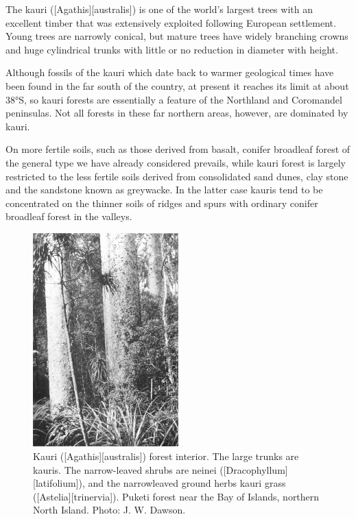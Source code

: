 The kauri ([Agathis][australis]) is one of the world's largest trees with an excellent timber that was extensively exploited following European settlement.
Young trees are narrowly conical, but mature trees have widely branching crowns and huge cylindrical trunks with little or no reduction in diameter with height.

Although fossils of the kauri which date back to warmer geological times have been found in the far south of the country, at present it reaches its limit at about \ang{38}S, so kauri forests are essentially a feature of the Northland and Coromandel peninsulas.
Not all forests in these far northern areas, however, are dominated by kauri.

On more fertile soils, such as those derived from basalt, conifer broadleaf forest of the general type we have already considered prevails, while kauri forest is largely restricted to the less fertile soils derived from consolidated sand dunes, clay stone and the sandstone known as greywacke.
In the latter case kauris tend to be concentrated on the thinner soils of ridges and spurs with ordinary conifer broadleaf forest in the valleys.

\begin{figure}
	\includegraphics[width=0.5\textwidth]{graphics/figure65kauri.jpg}
	\centering
	\caption[Kauri forest interior]{Kauri ([Agathis][australis]) forest interior.
	The large trunks are kauris.
	The narrow-leaved shrubs are neinei ([Dracophyllum][latifolium]), and the narrowleaved ground herbs kauri grass ([Astelia][trinervia]).
	Puketi forest near the Bay of Islands, northern North Island.
	Photo:  J. W. Dawson.}%
	\label{fig:65kauri}
\end{figure}

